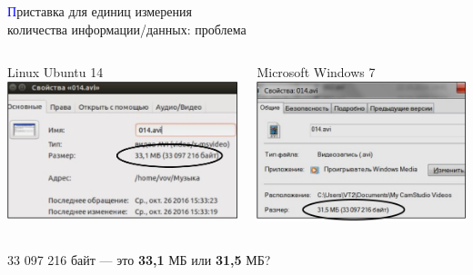 \begin{frame}[t]{\textcolor{blue}{П}риставка  для единиц измерения \\ количества информации/данных: проблема}
\begin{columns}[2]
	\column{5cm}
	\begin{center}
		Linux Ubuntu 14\\
		\vskip 0.2cm
		\includegraphics[scale=0.4]{ubuntu}
	\end{center}
	\column{5cm}
	\begin{center}
		Microsoft Windows 7\\
		\vskip 0.2cm
		\includegraphics[scale=0.4]{windows}
	\end{center}
\end{columns}
\begin{center}
	33 097 216 байт --- это \color[rgb]{0,0.7,0.4}\textbf{33,1}\color{black} МБ или \color[rgb]{0,0.7,0.4} \textbf{31,5} \color{black} МБ?
\end{center}
\end{frame}